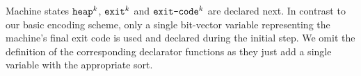 


%






\noindent
Machine states $\texttt{heap}^k$, $\texttt{exit}^k$ and $\texttt{exit-code}^k$ are declared next.
In contrast to our basic encoding scheme, only a single bit-vector variable representing the machine's final exit code is used and declared during the initial step.
We omit the definition of the corresponding declarator functions as they just add a single variable with the appropriate sort.

